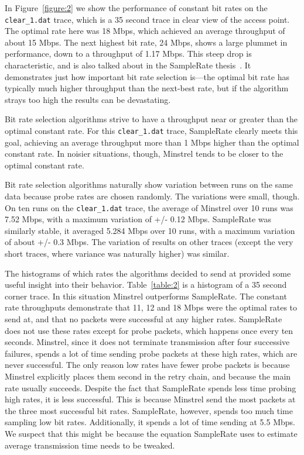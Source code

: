 \documentclass[twocolumn,10pt]{article}
\begin{document}
In Figure~\ref{figure:2} we show the performance of constant bit rates
on the \texttt{clear\_1.dat} trace, which is a 35 second trace in
clear view of the access point.  The optimal rate here was 18 Mbps,
which achieved an average throughput of about 15 Mbps.  The next
highest bit rate, 24 Mbps, shows a large plummet in performance, down
to a throughput of 1.17 Mbps.  This steep drop is characteristic, and
is also talked about in the SampleRate thesis~\cite{samplerate}.  It
demonstrates just how important bit rate selection is---the optimal
bit rate has typically much higher throughput than the next-best rate,
but if the algorithm strays too high the results can be devastating.

Bit rate selection algorithms strive to have a throughput near or
greater than the optimal constant rate.  For this \verb|clear_1.dat|
trace, SampleRate clearly meets this goal, achieving an average
throughput more than 1 Mbps higher than the optimal constant rate.  In
noisier situations, though, Minstrel tends to be closer to the optimal
constant rate.

Bit rate selection algorithms naturally show variation between runs on
the same data because probe rates are chosen randomly.  The variations
were small, though.  On ten runs on the \texttt{clear\_1.dat} trace,
the average of Minstrel over 10 runs was 7.52 Mbps, with a maximum
variation of +/- 0.12 Mbps.  SampleRate was similarly stable, it
averaged 5.284 Mbps over 10 runs, with a maximum variation of about
+/- 0.3 Mbps.  The variation of results on other traces (except the
very short traces, where variance was naturally higher) was similar.

The histograms of which rates the algorithms decided to send at
provided some useful insight into their behavior.  Table~\ref{table:2}
is a histogram of a 35 second corner trace.  In this situation
Minstrel outperforms SampleRate.  The constant rate throughputs
demonstrate that 11, 12 and 18 Mbps were the optimal rates to send at,
and that no packets were successful at any higher rates.  SampleRate
does not use these rates except for probe packets, which happens once
every ten seconds.  Minstrel, since it does not terminate transmission
after four successive failures, spends a lot of time sending probe
packets at these high rates, which are never successful.  The only
reason low rates have fewer probe packets is because Minstrel
explicitly places them second in the retry chain, and because the main
rate usually succeeds.  Despite the fact that SampleRate spends less
time probing high rates, it is less successful.  This is because
Minstrel send the most packets at the three most successful bit rates.
SampleRate, however, spends too much time sampling low bit rates.
Additionally, it spends a lot of time sending at 5.5 Mbps.  We suspect
that this might be because the equation SampleRate uses to estimate
average transmission time needs to be tweaked.
\end{document}
